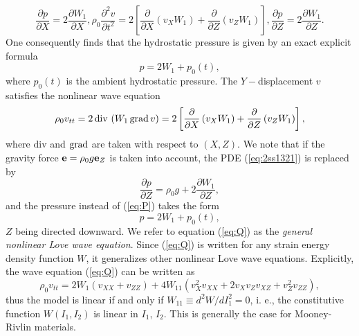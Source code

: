 \documentclass[11pt,letter,subeqn,fleqn]{article}
\numberwithin{equation}{section}
\numberwithin{table}{section}
\numberwithin{figure}{section}
\def\grad{{\hbox{\rm grad}}}
\def\div{{\hbox{\rm div}}}
\def\vec#1{{\boldsymbol{\rm #1}}} %
\def\vec#1{{\boldsymbol{\rm #1}}} %
\renewcommand{\div}{\mathrm{div}}
\begin{document}
\begin{subequations}\label{eq:chsse22s1}
	\begin{equation}\label{eq:2ss1121}
	\frac{\partial p }{\partial X}=2\frac{\partial W_{1} }{\partial X},
	\end{equation}
	\begin{equation}\label{eq:2ss1221}
	\rho_0\frac{\partial^2 v}{\partial t^{2}}=2\left[\frac{\partial}{\partial X}\left( v_{X}W_{1}\right)+\frac{\partial}{\partial Z}\left(v_{Z}W_{1}\right)\right],
	\end{equation}
	\begin{equation}\label{eq:2ss1321}
	\frac{\partial p}{\partial Z}=2\frac{\partial W_{1}}{\partial Z}.
	\end{equation}
\end{subequations}
One consequently finds that the hydrostatic pressure is given by an exact explicit formula
\begin{equation}\label{eq:P}
p=2W_{1}+p_{0}(t),
\end{equation}
where $p_{0}(t)$ is the ambient hydrostatic pressure. The $Y-$displacement $v$ satisfies the nonlinear wave equation
\begin{equation}\label{eq:Q}
\rho_{0}v_{tt}=2\,\div\,\left(W_{1}\, \grad\,v\right)=2\left[\frac{\partial}{\partial X}\left( v_{X}W_{1}\right)+\frac{\partial}{\partial Z}\left(v_{Z}W_{1}\right)\right],
\end{equation}
where $\div$ and $\grad$ are taken with respect to $(X,Z)$.  We note that if the gravity force $\displaystyle\vec{e}=\rho_{0}g\vec{e}_{Z}$ is taken into account, the PDE (\ref{eq:2ss1321}) is replaced by \begin{equation}\label{eq:Q1}
\frac{\partial p}{\partial Z}=\rho_{0}g+2\frac{\partial W_{1}}{\partial Z},
\end{equation}
and the pressure instead of (\ref{eq:P}) takes the form
\begin{equation}\label{eq:Q2}
p=2W_{1}+p_{0}(t),
\end{equation}
$Z$ being directed downward. We refer to equation (\ref{eq:Q}) as the \emph{general nonlinear Love wave equation}. Since (\ref{eq:Q}) is written for any strain energy density function $W$, it generalizes other nonlinear Love wave equations. Explicitly, the wave equation (\ref{eq:Q}) can be written as
\begin{equation}\label{eq:Q3}
\rho_0v_{tt}=2W_{1}\left(v_{XX}+v_{ZZ}\right)+4W_{11}\left(v^{2}_{X}v_{XX}+2v_{X}v_{Z}v_{XZ}+v^{2}_{Z}v_{ZZ}\right),
\end{equation}
thus the model is linear if and only if $\displaystyle W_{11} \equiv {d^2 W}/ dI_{1}^2 =0$, i. e., the constitutive function $W(I_{1},I_{2})$ is linear in $I_{1}$, $I_{2}$. This is generally the case for Mooney-Rivlin materials.
\end{document}
